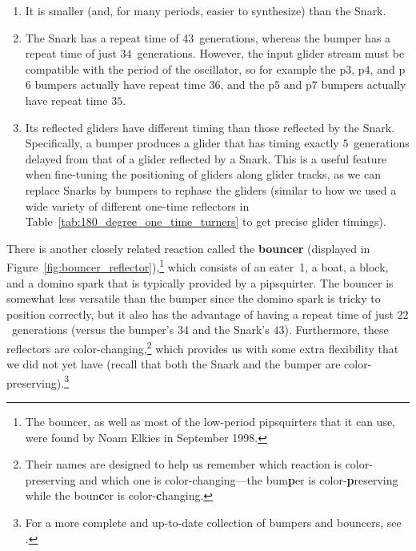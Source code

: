 \begin{enumerate}
	\item[1)] It is smaller (and, for many periods, easier to synthesize) than the Snark.\smallskip
	
	\item[2)] The Snark has a repeat time of $43$~generations, whereas the bumper has a repeat time of just $34$~generations. However, the input glider stream must be compatible with the period of the oscillator, so for example the p$3$, p$4$, and p$6$ bumpers actually have repeat time $36$, and the p$5$ and p$7$ bumpers actually have repeat time $35$.\smallskip
	
	\item[3)] Its reflected gliders have different timing than those reflected by the Snark. Specifically, a bumper produces a glider that has timing exactly $5$~generations delayed from that of a glider reflected by a Snark. This is a useful feature when fine-tuning the positioning of gliders along glider tracks, as we can replace Snarks by bumpers to rephase the gliders (similar to how we used a wide variety of different one-time reflectors in Table~\ref{tab:180_degree_one_time_turners} to get precise glider timings).\smallskip
\end{enumerate}

There is another closely related reaction called the \textbf{bouncer} (displayed in Figure~\ref{fig:bouncer_reflector}),\footnote{The bouncer, as well as most of the low-period pipsquirters that it can use, were found by Noam Elkies in September 1998.} which consists of an eater~1, a boat, a block, and a domino spark that is typically provided by a pipsquirter. The bouncer is somewhat less versatile than the bumper since the domino spark is tricky to position correctly, but it also has the advantage of having a repeat time of just $22$~generations (versus the bumper's $34$ and the Snark's $43$). Furthermore, these reflectors are color-changing,\footnote{Their names are designed to help us remember which reaction is color-preserving and which one is color-changing---the bum\textbf{p}er is color-\textbf{p}reserving while the boun\textbf{c}er is color-\textbf{c}hanging.} which provides us with some extra flexibility that we did not yet have (recall that both the Snark and the bumper are color-preserving).\footnote{For a more complete and up-to-date collection of bumpers and bouncers, see .}

